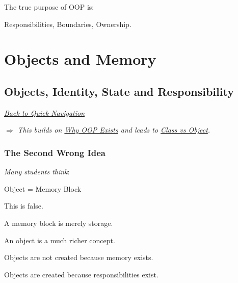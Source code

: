 \documentclass[11pt,a4paper]{book}
\begin{document}
\begin{rosettarule}

The true purpose of OOP is:

Responsibilities,
Boundaries,
Ownership.

\end{rosettarule}


\part{Objects and Memory}

\chapter{Objects, Identity, State and Responsibility}\label{chap:objects_identity}

\smallskip
\noindent
\hyperref[sec:quick_nav]{\emph{Back to Quick Navigation}}

\smallskip
\noindent
\textcolor{RosettaRoyalPurple}{$\Rightarrow$}
\emph{This builds on \hyperref[chap:why_oop]{Why OOP Exists} and leads to \hyperref[chap:class_vs_object]{Class vs Object}.}


\section{The Second Wrong Idea}

\begin{trap}

\emph{Many students think}:

\begin{center}
Object = Memory Block
\end{center}

This is false.

A memory block is merely storage.

An object is a much richer concept.

\end{trap}

\begin{rosettarule}

Objects are not created because memory exists.

Objects are created because {\ttfamily responsibilities} exist.

\end{rosettarule}
\end{document}
